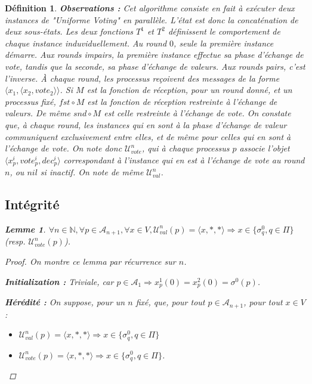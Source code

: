 \documentclass{article}
\newtheorem{lemma}{Lemme}
\newtheorem{definition}{Définition}
\begin{document}
\begin{definition}
\textbf{Observations :} Cet algorithme consiste en fait à exécuter deux instances de "Uniforme Voting" en parallèle.
L'état est donc la concaténation de deux sous-états.
Les deux fonctions $T^1$ et $T^2$ définissent le comportement de chaque instance induviduellement.
Au round $0$, seule la première instance démarre.
Aux rounds impairs, la première instance effectue sa phase d'échange de vote, tandis que la seconde, sa phase d'échange de valeurs.
Aux rounds pairs, c'est l'inverse.
À chaque round, les processus reçoivent des messages de la forme $\langle x_1 , \langle x_2, vote_2 \rangle \rangle$.
Si $M$ est la fonction de réception, pour un round donné, et un processus fixé, $fst \circ M$ est la fonction de réception restreinte à l'échange de valeurs.
De même $snd \circ M$ est celle restreinte à l'échange de vote.
On constate que, à chaque round, les instances qui en sont à la phase d'échange de valeur communiquent exclusivement entre elles, et de même pour celles qui en sont à l'échange de vote.
On note donc $\mathcal{U}_{vote}^n$, qui à chaque processus $p$ associe l'objet $\langle x^i_p, vote^i_p, dec^i_p \rangle$
correspondant à l'instance qui en est à l'échange de vote au round $n$, ou $nil$ si inactif. On note de même $\mathcal{U}_{val}^n$.

\subsection{Intégrité}
\begin{lemma}
	$\forall n \in \mathds{N}, \forall p \in \mathcal{A}_{n+1}, \forall x \in V, \mathcal{U}_{val}^n(p) = \langle x, *, * \rangle \Rightarrow x \in \{\sigma^0_q, q \in \Pi\}$
	(resp. $\mathcal{U}_{vote}^n(p)$).
\end{lemma}
\begin{proof}

	On montre ce lemma par récurrence sur $n$.

	\textbf{Initialization :} Triviale, car $p \in \mathcal{A}_1 \Rightarrow x^1_p(0) = x^2_p(0) = \sigma^0(p)$.

	\textbf{Hérédité :} On suppose, pour un $n$ fixé, que, pour tout $p \in \mathcal{A}_{n+1}$, pour tout $x \in V$ :
	\begin{itemize}

		\item $\mathcal{U}_{val}^n(p)  = \langle x, *, * \rangle \Rightarrow x \in \{\sigma^0_q, q \in \Pi\}$
		\item $\mathcal{U}_{vote}^n(p) = \langle x, *, * \rangle \Rightarrow x \in \{\sigma^0_q, q \in \Pi\}$.


\end{itemize}
\end{proof}
\end{definition}
\end{document}
